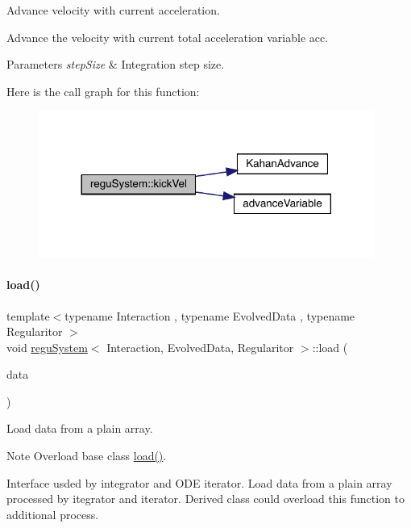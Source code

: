 Advance velocity with current acceleration. 

Advance the velocity with current total acceleration variable \textquotesingle{}acc\textquotesingle{}. 
\begin{DoxyParams}{Parameters}
{\em step\+Size} & Integration step size. \\
\hline
\end{DoxyParams}
Here is the call graph for this function\+:\nopagebreak
\begin{figure}[H]
\begin{center}
\leavevmode
\includegraphics[width=312pt]{classregu_system_a16cf42c1efb79a8ed5f9fecad7ad13dc_cgraph}
\end{center}
\end{figure}
\mbox{\label{classregu_system_a4da424f127c024fcbef32eff3147b2ff}} 
\paragraph{\texorpdfstring{load()}{load()}}
{\footnotesize\ttfamily template$<$typename Interaction , typename Evolved\+Data , typename Regularitor $>$ \\
void \mbox{\hyperlink{classregu_system}{regu\+System}}$<$ Interaction, Evolved\+Data, Regularitor $>$\+::load (\begin{DoxyParamCaption}\item[{\mbox{\hyperlink{classregu_system_ae2ca73edf865e016a858b694c1d2b49a}{Plain\+Array}} \&}]{data }\end{DoxyParamCaption})}



Load data from a plain array. 

\begin{DoxyNote}{Note}
Overload base class \mbox{\hyperlink{classregu_system_a4da424f127c024fcbef32eff3147b2ff}{load()}}.
\end{DoxyNote}
Interface usded by integrator and O\+DE iterator. Load data from a plain array processed by itegrator and iterator. Derived class could overload this function to additional process.


